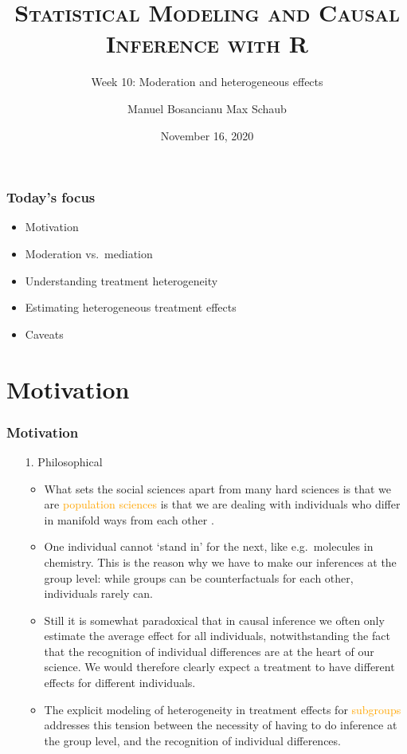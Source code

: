 \documentclass[12pt,english,dvipsnames,aspectratio=169,handout]{beamer}\usepackage[]{graphicx}\usepackage[]{xcolor}
\title{\textsc{Statistical Modeling and Causal Inference with R}}
\subtitle{Week 10: Moderation and heterogeneous effects}
\date{November 16, 2020}
\author{Manuel Bosancianu \hfill Max Schaub}
\institute{Hertie School of Governance}
\begin{document}
\maketitle

\begin{frame}
	\frametitle{Today's focus}
	\begin{itemize}
		\item Motivation
		\item Moderation vs.\ mediation
		\item Understanding treatment heterogeneity
		\item Estimating heterogeneous treatment effects
		\item Caveats
	\end{itemize}
\end{frame}


\section{Motivation}

\begin{frame}
  \frametitle{Motivation}
\footnotesize

\begin{enumerate} 
\item[1.] Philosophical
    \begin{itemize} \scriptsize
    \item What sets the social sciences apart from many hard sciences is that we are \textcolor{orange}{population sciences} is that we are dealing with individuals who differ in manifold ways from each other \cite{xie_population_2013}. 
    \item One individual cannot `stand in' for the next, like e.g.\ molecules in chemistry. This is the reason why we have to make our inferences at the group level: while groups can be counterfactuals for each other, individuals rarely can. 
    \item Still it is somewhat paradoxical that in causal inference we often only estimate the average effect for all individuals, notwithstanding the fact that the recognition of individual differences are at the heart of our science. We would therefore clearly expect a treatment to have different effects for different individuals.
    \item The explicit modeling of heterogeneity in treatment effects for \textcolor{orange}{subgroups} addresses this tension between the necessity of having to do inference at the group level, and the recognition of individual differences.
    \end{itemize}
\end{enumerate}

\end{frame}
\end{document}
